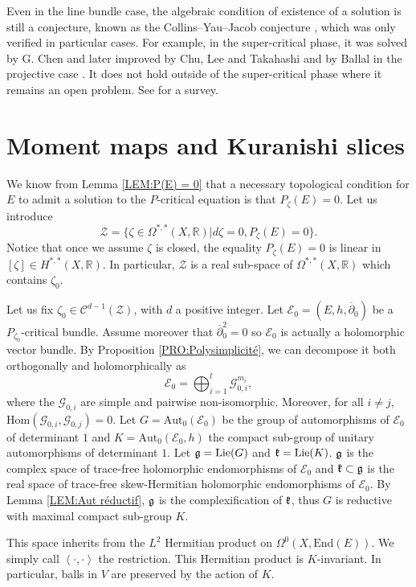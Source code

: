 \documentclass{article}
\theoremstyle{remark}
\theoremstyle{definition}
\newcommand{\R}{\mathbb{R}}
\newcommand{\Hom}{\mathrm{Hom}}
\newcommand{\End}{\mathrm{End}}
\newcommand{\Aut}{\mathrm{Aut}}
\newcommand{\Lie}{\mathrm{Lie}}
\newcommand{\scal}[2]{\left< #1,#2 \right>}
\newcommand{\E}{\mathcal{E}}
\newcommand{\G}{\mathcal{G}}
\newcommand{\mC}{\mathcal{C}}
\newcommand{\mZ}{\mathcal{Z}}
\newcommand{\dbar}{\overline{\partial}}
\begin{document}
Even in the line bundle case, the algebraic condition of existence of a solution is still a conjecture, known as the Collins--Yau--Jacob conjecture \cite[Conjecture 1.4]{Collins_Yau_Jacob}, which was only verified in particular cases. For example, in the super-critical phase, it was solved by G. Chen \cite[Theorem 1.7]{Chen} and later improved by Chu, Lee and Takahashi \cite[Theorem 1.2]{CLT} and by Ballal in the projective case \cite[Corollary 1]{Ballal}. It does not hold outside of the super-critical phase \cite[Remark 1.10]{Chen} where it remains an open problem. See \cite{Collins_Shi} for a survey.

\section{Moment maps and Kuranishi slices}\label{SEC:Kuranishi}

We know from Lemma \ref{LEM:P(E) = 0} that a necessary topological condition for $E$ to admit a solution to the $P$-critical equation is that $P_\zeta(E) = 0$. Let us introduce
$$
\mZ = \{\zeta \in \Omega^{*,*}(X,\R)|d\zeta = 0, P_\zeta(E) = 0\}.
$$
Notice that once we assume $\zeta$ is closed, the equality $P_\zeta(E) = 0$ is linear in $[\zeta] \in H^{*,*}(X,\R)$. In particular, $\mZ$ is a real sub-space of $\Omega^{*,*}(X,\R)$ which contains $\zeta_0$.

Let us fix $\zeta_0 \in \mC^{d - 1}(\mZ)$, with $d$ a positive integer. Let $\E_0 = (E,h,\dbar_0)$ be a $P_{\zeta_0}$-critical bundle. Assume moreover that $\dbar_0^2 = 0$ so $\E_0$ is actually a holomorphic vector bundle. By Proposition \ref{PRO:Polysimplicité}, we can decompose it both orthogonally and holomorphically as
$$
\E_0 = \bigoplus_{i = 1}^l \G_{0,i}^{m_i},
$$
where the $\G_{0,i}$ are simple and pairwise non-isomorphic. Moreover, for all $i \neq j$, $\Hom(\G_{0,i},\G_{0,j}) = 0$. Let $G = \Aut_0(\E_0)$ be the group of automorphisms of $\E_0$ of determinant $1$ and $K = \Aut_0(\E_0,h)$ the compact sub-group of unitary automorphisms of determinant $1$. Let $\frak{g} = \Lie(G)$ and $\frak{k} = \Lie(K)$. $\frak{g}$ is the complex space of trace-free holomorphic endomorphisms of $\E_0$ and $\frak{k} \subset \frak{g}$ is the real space of trace-free skew-Hermitian holomorphic endomorphisms of $\E_0$. By Lemma \ref{LEM:Aut réductif}, $\frak{g}$ is the complexification of $\frak{k}$, thus $G$ is reductive with maximal compact sub-group $K$.

This space inherits from the $L^2$ Hermitian product on $\Omega^0(X,\End(E))$. We simply call $\scal{\cdot}{\cdot}$ the restriction. This Hermitian product is $K$-invariant. In particular, balls in $V$ are preserved by the action of $K$.
\end{document}
